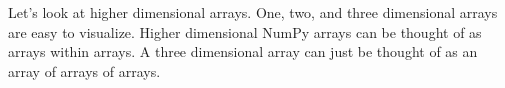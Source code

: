 Let's look at higher dimensional arrays.
One, two, and three dimensional arrays are easy to visualize.
Higher dimensional NumPy arrays can be thought of as arrays within arrays.
A three dimensional array can just be thought of as an array of arrays of arrays.

